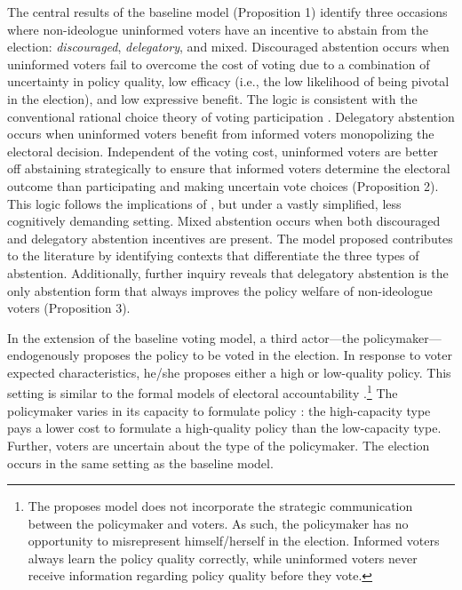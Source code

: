 \documentclass[doc,natbib,12pt]{apa6}
\begin{document}
	\par The central results of the baseline model (Proposition 1) identify three occasions where non-ideologue uninformed voters have an incentive to abstain from the election: \textit{discouraged}, \textit{delegatory}, and mixed. 
	Discouraged abstention occurs when uninformed voters fail to overcome the cost of voting due to a combination of uncertainty in policy quality, low efficacy (i.e., the low likelihood of being pivotal in the election), and low expressive benefit. The logic is consistent with the conventional rational choice theory of voting participation \citep{Downs1957anec, Riker1968thof, Matsusaka1995exvo}. Delegatory abstention occurs when uninformed voters benefit from informed voters monopolizing the electoral decision. Independent of the voting cost, uninformed voters are better off abstaining strategically to ensure that informed voters determine the electoral outcome than participating and making uncertain vote choices (Proposition 2). This logic follows the implications of \cite{Feddersen1996thsw, Feddersen1999abin}, but under a vastly simplified, less cognitively demanding setting. Mixed abstention occurs when both discouraged and delegatory abstention incentives are present. The model proposed contributes to the literature by identifying contexts that differentiate the three types of abstention. Additionally, further inquiry reveals that delegatory abstention is the only abstention form that always improves the policy welfare of non-ideologue voters (Proposition 3).
	
	\par In the extension of the baseline voting model, a third actor---the policymaker---endogenously proposes the policy to be voted in the election. In response to voter expected characteristics, he/she proposes either a high or low-quality policy. This setting is similar to the formal models of electoral accountability \citep[e.g.,][]{Prato2016thvo, Prato2018raig}.\footnote{The proposes model does not incorporate the strategic communication between the policymaker and voters. As such, the policymaker has no opportunity to misrepresent himself/herself in the election. Informed voters always learn the policy quality correctly, while uninformed voters never receive information regarding policy quality before they vote.} The policymaker varies in its capacity to formulate policy \citep{Gailmard2007slan, Huber2004buca}: the high-capacity type pays a lower cost to formulate a high-quality policy than the low-capacity type. Further, voters are uncertain about the type of the policymaker. The election occurs in the same setting as the baseline model. 
	
\end{document}

